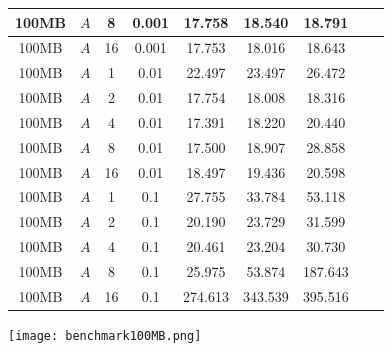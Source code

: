 \begin{figure}[H]
\begin{tabular}{|c|c|c|c|c|c|c|c|c|}
        100MB & $A$ & 8 & 0.001 & 17.758 & 18.540 & 18.791\\\hline
        100MB & $A$ & 16 & 0.001 & 17.753 & 18.016 & 18.643\\\hline
        100MB & $A$ & 1 & 0.01 & 22.497 & 23.497 & 26.472\\\hline
        100MB & $A$ & 2 & 0.01 & 17.754 & 18.008 & 18.316\\\hline
        100MB & $A$ & 4 & 0.01 & 17.391 & 18.220 & 20.440\\\hline
        100MB & $A$ & 8 & 0.01 & 17.500 & 18.907 & 28.858\\\hline
        100MB & $A$ & 16 & 0.01 & 18.497 & 19.436 & 20.598\\\hline
        100MB & $A$ & 1 & 0.1 & 27.755 & 33.784 & 53.118\\\hline
        100MB & $A$ & 2 & 0.1 & 20.190 & 23.729 & 31.599\\\hline
        100MB & $A$ & 4 & 0.1 & 20.461 & 23.204 & 30.730\\\hline
        100MB & $A$ & 8 & 0.1 & 25.975 & 53.874 & 187.643\\\hline
        100MB & $A$ & 16 & 0.1 & 274.613 & 343.539 & 395.516\\\hline
    \end{tabular}
    \vspace{1cm}
    \texttt{[image: benchmark100MB.png]}
\end{figure}
